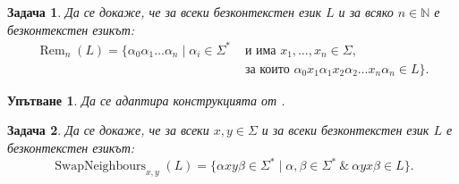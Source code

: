 \documentclass[12pt]{article}
\newtheorem{problem}{Задача}[section]
\newtheorem*{hint}{Упътване}
\theoremstyle{definition}
\begin{document}
\begin{problem}
Да се докаже, че за всеки безконтекстен език $L$ и за всяко $n \in \mathbb{N}$ е безконтекстен езикът:
\begin{align*}
    \operatorname{Rem}_n(L) = \{ \alpha_0 \alpha_1 \dots \alpha_n  \mid \alpha_i \in \Sigma^* & \text{ и има } x_1, \dots, x_n \in \Sigma ,                                       \\
                                                                                              & \text{ за които } \alpha_0 x_1 \alpha_1 x_2 \alpha_2 \dots x_n \alpha_n \in L \}.
\end{align*}
\end{problem}

\begin{hint}
    Да се адаптира конструкцията от .
\end{hint}

\begin{problem}
Да се докаже, че за всеки $x, y \in \Sigma$ и за всеки безконтекстен език $L$ е безконтекстен езикът:
\[
    \operatorname{SwapNeighbours}_{x, y}(L) = \{ \alpha x y \beta \in \Sigma^* \mid \alpha, \beta \in \Sigma^* \: \& \: \alpha y x \beta \in L \}.
\]
\end{problem}
\end{document}
